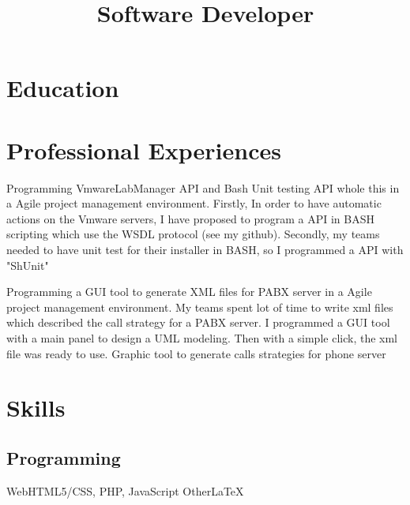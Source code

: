 \documentclass[11pt,a4paper]{moderncv}
\title{Software Developer}
\begin{document}
\maketitle
\vspace*{1cm}

\section{Education}

\section{Professional Experiences}
%
{Programming VmwareLabManager API and Bash Unit testing API whole this in a Agile project management environment. Firstly, In order to have automatic actions on the Vmware servers, I have proposed to program a API in BASH scripting which use the WSDL protocol (see my github). Secondly, my teams needed to have unit test for their installer in BASH, so I programmed a API with "ShUnit"}

%
{Programming a GUI tool to generate XML files for PABX server in a Agile project management environment. My teams spent lot of time to write xml files which described the call strategy for a PABX server. I programmed a GUI tool with a main panel to design a UML modeling. Then with a simple click, the xml file was ready to use. Graphic tool to generate calls strategies for phone server}

\section{Skills}
\subsection{Programming}
%
{Web}{HTML5/CSS, PHP, JavaScript}
%
{Other}{\LaTeX}%
\end{document}
